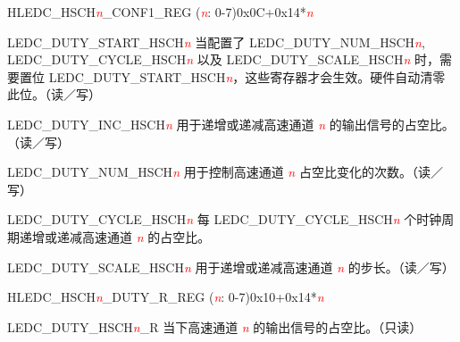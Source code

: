\begin{register}{H}{LEDC\_HSCH\textit{\textcolor{red}{\it{n}}}\_CONF1\_REG (\textit{\textcolor{red}{\it{n}}}: 0-7)}{0x0C+0x14*\textit{\textcolor{red}{\it{n}}}}\label{regdesc:LEDCHSCHnCONF1REG}
%
%
%
%
%
\regnewline%
\begin{regdesc}\begin{reglist}
\item [LEDC\_DUTY\_START\_HSCH\textcolor{red}{\it{n}}]\label{regdesc:LEDCDUTYSTARTHSCHn} 当配置了 LEDC\_DUTY\_NUM\_HSCH\textcolor{red}{\it{n}}, LEDC\_DUTY\_CYCLE\_HSCH\textcolor{red}{\it{n}} 以及 LEDC\_DUTY\_SCALE\_HSCH\textcolor{red}{\it{n}} 时，需要置位 LEDC\_DUTY\_START\_HSCH\textcolor{red}{\it{n}}，这些寄存器才会生效。硬件自动清零此位。（读／写）
\item [LEDC\_DUTY\_INC\_HSCH\textcolor{red}{\it{n}}]\label{regdesc:LEDCDUTYINCHSCHn} 用于递增或递减高速通道 \textcolor{red}{\it{n}} 的输出信号的占空比。（读／写）
\item [LEDC\_DUTY\_NUM\_HSCH\textcolor{red}{\it{n}}]\label{regdesc:LEDCDUTYNUMHSCHn} 用于控制高速通道 \textcolor{red}{\it{n}} 占空比变化的次数。（读／写）
\item [LEDC\_DUTY\_CYCLE\_HSCH\textcolor{red}{\it{n}}]\label{regdesc:LEDCDUTYCYCLEHSCHn} 每 LEDC\_DUTY\_CYCLE\_HSCH\textcolor{red}{\it{n}} 个时钟周期递增或递减高速通道 \textcolor{red}{\it{n}} 的占空比。
\item [LEDC\_DUTY\_SCALE\_HSCH\textcolor{red}{\it{n}}]\label{regdesc:LEDCDUTYSCALEHSCHn} 用于递增或递减高速通道 \textcolor{red}{\it{n}} 的步长。（读／写）
\end{reglist}\end{regdesc}
\end{register}


\begin{register}{H}{LEDC\_HSCH\textit{\textcolor{red}{\it{n}}}\_DUTY\_R\_REG (\textit{\textcolor{red}{\it{n}}}: 0-7)}{0x10+0x14*\textit{\textcolor{red}{\it{n}}}}\label{regdesc:LEDCHSCHnDUTYRREG}
%
%
\regnewline%
\begin{regdesc}\begin{reglist}
\item [LEDC\_DUTY\_HSCH\textcolor{red}{\it{n}}\_R] 当下高速通道 \textcolor{red}{\it{n}} 的输出信号的占空比。（只读）
\end{reglist}\end{regdesc}
\end{register}



